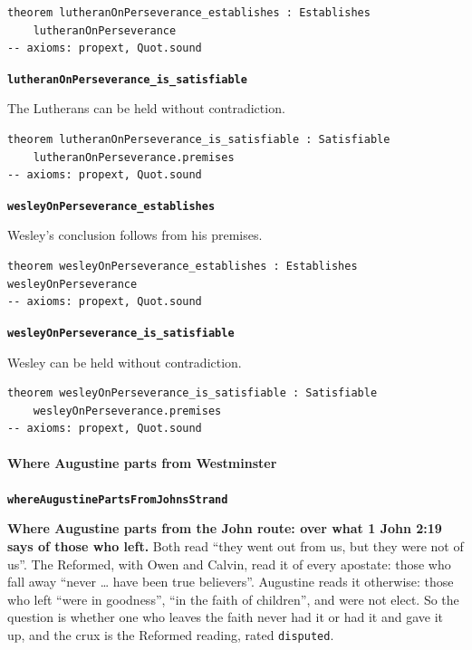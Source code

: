\documentclass[11pt]{article}
\begin{document}
{\small\begin{verbatim}
theorem lutheranOnPerseverance_establishes : Establishes
    lutheranOnPerseverance
-- axioms: propext, Quot.sound
\end{verbatim}}
\par\medskip\noindent\textbf{\texttt{lutheran\allowbreak{}On\allowbreak{}Perseverance\_\allowbreak{}is\_\allowbreak{}satisfiable}}\par\nobreak\noindent
The Lutherans can be held without contradiction.

{\small\begin{verbatim}
theorem lutheranOnPerseverance_is_satisfiable : Satisfiable
    lutheranOnPerseverance.premises
-- axioms: propext, Quot.sound
\end{verbatim}}
\par\medskip\noindent\textbf{\texttt{wesley\allowbreak{}On\allowbreak{}Perseverance\_\allowbreak{}establishes}}\par\nobreak\noindent
Wesley’s conclusion follows from his premises.

{\small\begin{verbatim}
theorem wesleyOnPerseverance_establishes : Establishes wesleyOnPerseverance
-- axioms: propext, Quot.sound
\end{verbatim}}
\par\medskip\noindent\textbf{\texttt{wesley\allowbreak{}On\allowbreak{}Perseverance\_\allowbreak{}is\_\allowbreak{}satisfiable}}\par\nobreak\noindent
Wesley can be held without contradiction.

{\small\begin{verbatim}
theorem wesleyOnPerseverance_is_satisfiable : Satisfiable
    wesleyOnPerseverance.premises
-- axioms: propext, Quot.sound
\end{verbatim}}
\paragraph*{Where Augustine parts from Westminster}
\leavevmode\par\nobreak
\par\medskip\noindent\textbf{\texttt{where\allowbreak{}Augustine\allowbreak{}Parts\allowbreak{}From\allowbreak{}Johns\allowbreak{}Strand}}\par\nobreak\noindent
\textbf{Where Augustine parts from the John route: over what 1 John 2:19 says of those who left.} Both read “they went out from us, but they were not of us”. The Reformed, with Owen and Calvin, read it of every apostate: those who fall away “never … have been true believers”. Augustine reads it otherwise: those who left “were in goodness”, “in the faith of children”, and were not elect. So the question is whether one who leaves the faith never had it or had it and gave it up, and the crux is the Reformed reading, rated \texttt{disputed}.
\end{document}
